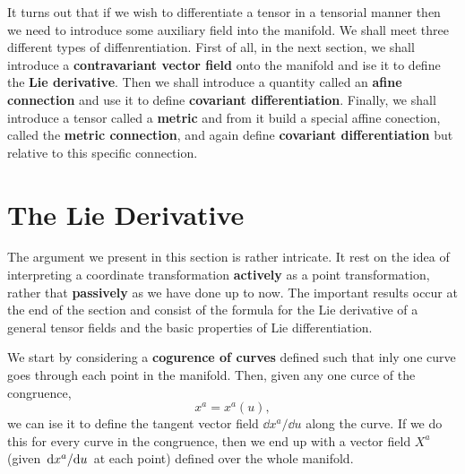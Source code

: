 It turns out that if  we wish to differentiate a tensor in a tensorial manner then we need to introduce some auxiliary field into the manifold. We shall meet three different types of diffenrentiation. First of all, in the next section, we shall introduce a \textbf{contravariant vector field} onto the manifold and ise it to define the \textbf{Lie derivative}. Then we shall introduce a quantity called an \textbf{afine connection} and use it to define \textbf{covariant differentiation}. Finally, we shall introduce a tensor called a \textbf{metric} and from it build a special affine conection, called the \textbf{metric connection}, and again define \textbf{covariant differentiation} but relative to this specific connection.

\section{The Lie Derivative}\label{sec:6.2}
The argument we present in this section is rather intricate. It rest on the idea of interpreting a coordinate transformation \textbf{actively} as a point transformation, rather that \textbf{passively} as we have done up to now.  The important results occur at the end of the section and consist of the formula for the Lie derivative of a general tensor fields and the basic properties of Lie differentiation.

We start by considering a \textbf{cogurence of curves}  defined such that inly one curve goes through each point in the manifold. Then, given any one curce of the congruence, $$x^{a}=x^{a}(u),$$ we can ise it to define the tangent vector field $\dd x^{a}/\dd u$ along the curve. If we do this for every curve in the congruence, then we end up with a vector field $X^{a}$ (given $\dv*{x^{a}}{u}$ at each point) defined over the whole manifold. 

